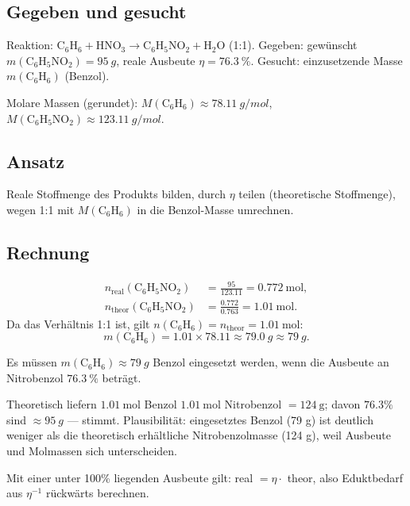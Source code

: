 
\subsection*{Gegeben und gesucht}
Reaktion: $\mathrm{C_6H_6} + \mathrm{HNO_3} \rightarrow
\mathrm{C_6H_5NO_2} + \mathrm{H_2O}$ (1:1). Gegeben: gewünscht
$m(\mathrm{C_6H_5NO_2}) = \qty{95}{g}$, reale Ausbeute
$\eta = \qty{76.3}{\percent}$. Gesucht: einzusetzende
Masse $m(\mathrm{C_6H_6})$ (Benzol).

Molare Massen (gerundet): $M(\mathrm{C_6H_6}) \approx \qty{78.11}{g/mol}$,
$M(\mathrm{C_6H_5NO_2}) \approx \qty{123.11}{g/mol}$.

\subsection*{Ansatz}
Reale Stoffmenge des Produkts bilden, durch $\eta$ teilen (theoretische
Stoffmenge), wegen 1:1 mit $M(\mathrm{C_6H_6})$ in die Benzol-Masse
umrechnen.

\subsection*{Rechnung}
\begin{align*}
  n_{\text{real}}(\mathrm{C_6H_5NO_2})
    &= \frac{95}{123.11} = 0.772\ \mathrm{mol}, \\
  n_{\text{theor}}(\mathrm{C_6H_5NO_2})
    &= \frac{0.772}{0.763} = 1.01\ \mathrm{mol}.
\end{align*}
Da das Verhältnis 1:1 ist, gilt
$n(\mathrm{C_6H_6}) = n_{\text{theor}} = 1.01\ \mathrm{mol}$:
\begin{equation}
  m(\mathrm{C_6H_6}) = 1.01 \times 78.11
  \approx \qty{79.0}{g} \approx \qty{79}{g}.
\end{equation}

\begin{ergebnis}
Es müssen $m(\mathrm{C_6H_6}) \approx \qty{79}{g}$ Benzol eingesetzt werden,
wenn die Ausbeute an Nitrobenzol $\qty{76.3}{\percent}$ beträgt.
\end{ergebnis}

\begin{kontrolle}
Theoretisch liefern $1.01\ \mathrm{mol}$ Benzol $1.01\ \mathrm{mol}$ Nitrobenzol
$= 124\ \mathrm{g}$; davon $76.3\%$ sind $\approx \qty{95}{g}$ --- stimmt.
Plausibilität: eingesetztes Benzol (79 g) ist deutlich weniger als die
theoretisch erhältliche Nitrobenzolmasse (124 g), weil Ausbeute und Molmassen
sich unterscheiden.
\end{kontrolle}

\begin{merksatz}
Mit einer unter 100\% liegenden Ausbeute gilt: real $= \eta\cdot$ theor, also
Eduktbedarf aus $\eta^{-1}$ rückwärts berechnen.
\end{merksatz}
